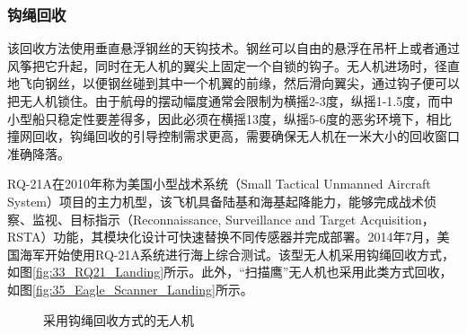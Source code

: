 \subsubsection{钩绳回收}
该回收方法使用垂直悬浮钢丝的天钩技术。钢丝可以自由的悬浮在吊杆上或者通过风筝把它升起，同时在无人机的翼尖上固定一个自锁的钩子。无人机进场时，径直地飞向钢丝，以便钢丝碰到其中一个机翼的前缘，然后滑向翼尖，通过钩子便可以把无人机锁住。由于航母的摆动幅度通常会限制为横摇2-3度，纵摇1-1.5度，而中小型船只稳定性要差得多，因此必须在横摇13度，纵摇5-6度的恶劣环境下，相比撞网回收，钩绳回收的引导控制需求更高，需要确保无人机在一米大小的回收窗口准确降落。

RQ-21A在2010年称为美国小型战术系统（Small Tactical Unmanned Aircraft System）项目的主力机型，该飞机具备陆基和海基起降能力，能够完成战术侦察、监视、目标指示（Reconnaissance, Surveillance and Target Acquisition，RSTA）功能，其模块化设计可快速替换不同传感器并完成部署。2014年7月，美国海军开始使用RQ-21A系统进行海上综合测试。该型无人机采用钩绳回收方式，如图\ref{fig:33_RQ21_Landing}所示。此外，“扫描鹰”无人机也采用此类方式回收，如图\ref{fig:35_Eagle_Scanner_Landing}所示。

\begin{figure}[htb]
	\centering%
	\hspace{0.1em}%
	\hspace{0.1em}
	\caption{采用钩绳回收方式的无人机}
	\label{fig:33_RQ21withScanner_Landing}
\end{figure}


